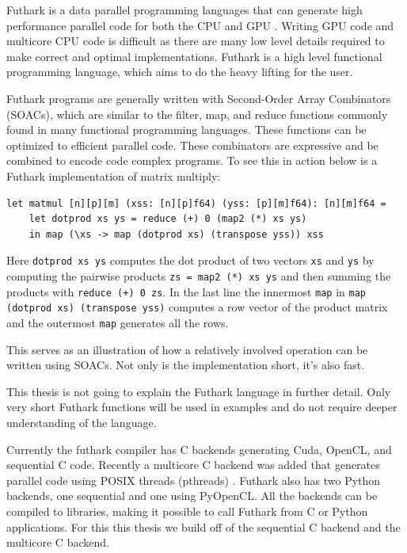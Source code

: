 \documentclass[11pt]{book}
\begin{document}
Futhark \cite{futhark-og} \cite{futhark_phd} is a data parallel programming languages that can generate high performance parallel code for both the CPU and GPU .  Writing GPU code and multicore CPU code is difficult as there are many low level details required to make correct and optimal implementations. Futhark is a high level functional programming language, which aims to do the heavy lifting for the user.



Futhark programs are generally written with Second-Order Array Combinators (SOACs), which are similar to the filter, map, and reduce functions commonly found in many functional programming languages. These functions can be optimized to efficient parallel code. These combinators are  expressive and be combined to encode code complex programs. 
%
%
To see this in action below is a Futhark implementation of matrix multiply:
\begin{verbatim}
let matmul [n][p][m] (xss: [n][p]f64) (yss: [p][m]f64): [n][m]f64 =
    let dotprod xs ys = reduce (+) 0 (map2 (*) xs ys)
    in map (\xs -> map (dotprod xs) (transpose yss)) xss
\end{verbatim}
Here \texttt{dotprod xs ys} computes the dot product of two vectors \texttt{xs} and \texttt{ys} by computing the pairwise products \texttt{zs = map2 (*) xs ys} and then summing the products with \texttt{reduce (+) 0 zs}.
In the last line the innermost \texttt{map} in \texttt{map (dotprod xs) (transpose yss)} computes a row vector of the product matrix and the outermost \texttt{map} generates all the rows.

This serves as an illustration of how a relatively involved operation can be written using SOACs. Not only is the implementation short, it's also fast.

This thesis is not going to explain the Futhark language in further detail. Only very short Futhark functions will be used in examples and do not require deeper understanding of the language.

Currently the futhark compiler has C backends generating Cuda, OpenCL, and sequential C code. Recently a multicore C backend was added that generates parallel code using POSIX threads (pthreads) \cite{multicore}. Futhark also has two Python backends, one sequential and one using PyOpenCL. All the backends can be compiled to libraries, making it possible to call Futhark from C or Python applications. For this this thesis we build off of the sequential C backend and the multicore C backend. 
\end{document}
